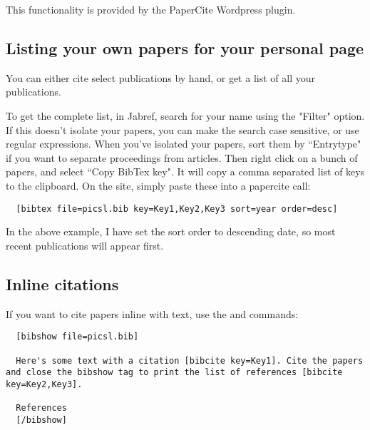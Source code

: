 \documentclass{InsightArticle}
\begin{document}
This functionality is provided by the PaperCite Wordpress plugin. 

\subsection{Listing your own papers for your personal page}

You can either cite select publications by hand, or get a list of all your publications.

To get the complete list, in Jabref, search for your name using the "Filter" option. If this doesn't isolate your papers, you can make the search case sensitive, or use regular expressions. When you've isolated your papers, sort them by ``Entrytype" if you want to separate proceedings from articles. Then right click on a bunch of papers, and select ``Copy BibTex key". It will copy a comma separated list of keys to the clipboard. On the site, simply paste these into a papercite call:
\begin{lstlisting}
  [bibtex file=picsl.bib key=Key1,Key2,Key3 sort=year order=desc]
\end{lstlisting}

In the above example, I have set the sort order to descending date, so most recent publications will appear first.


\subsection{Inline citations}

If you want to cite papers inline with text, use the  and  commands:
\begin{lstlisting}
  [bibshow file=picsl.bib]
 
  Here's some text with a citation [bibcite key=Key1]. Cite the papers and close the bibshow tag to print the list of references [bibcite key=Key2,Key3].
  
  References
  [/bibshow]
\end{lstlisting}




\end{document}
